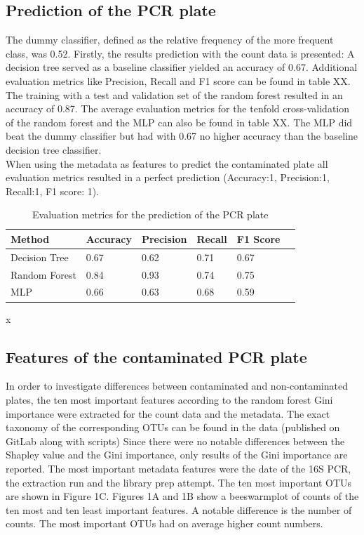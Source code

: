 \documentclass{svproc}
\begin{document}
\subsection{Prediction of the PCR plate}
The dummy classifier, defined as the relative frequency of the more frequent class, was 0.52. Firstly, the results prediction with the count data is presented: A decision tree served as a baseline classifier yielded an accuracy of 0.67. Additional evaluation metrics like Precision, Recall and F1 score can be found in table XX. The training with a test and validation set of the random forest resulted in an accuracy of 0.87. The average evaluation metrics for the tenfold cross-validation of the random forest and the MLP can also be found in table XX. The MLP did beat the dummy classifier but had with 0.67 no higher accuracy than the baseline decision tree classifier. \\
When using the metadata as features to predict the contaminated plate all evaluation metrics resulted in a perfect prediction (Accuracy:1, Precision:1, Recall:1, F1 score: 1).
\begin{table}
   \caption{Evaluation metrics for the prediction of the PCR plate}
   \begin{center}
       \begin{tabular}{l@{\quad}lllll}
           \hline
         
                  Method & Accuracy & Precision & Recall & F1 Score\\[2pt]
                                   \hline\rule{0pt}{12pt}
                   Decision Tree  &    0.67 & 0.62 & 0.71 & 0.67 \\
                   Random Forest &    0.84 & 0.93 & 0.74 & 0.75 \\
                   MLP   &    0.66 & 0.63 & 0.68 & 0.59 \\
                   [2pt]
                   \hline
       \end{tabular}
   \end{center}x
   \label{tab1}
\end{table}


\subsection{Features of the contaminated PCR plate}
In order to investigate differences between contaminated and non-contaminated plates, the ten most important features according to the random forest Gini importance were extracted for the count data and the metadata. The exact taxonomy of the corresponding OTUs can be found in the data (published on GitLab along with scripts) Since there were no notable differences between the Shapley value and the Gini importance, only results of the Gini importance are reported.
The most important metadata features were the date of the 16S PCR, the extraction run and the library prep attempt. The ten most important OTUs are shown in Figure 1C. Figures 1A and 1B show a beeswarmplot of counts of the ten most and ten least important features. A notable difference is the number of counts. The most important OTUs had on average higher count numbers.
\end{document}
